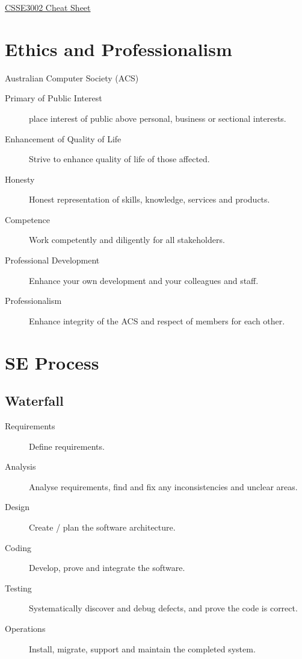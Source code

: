\documentclass[landscape]{cheat}
\begin{document}
\footnotesize
\begin{multicols}{3}

\begin{center}
\Large{\underline{CSSE3002 Cheat Sheet}} \\
\end{center}

\section{Ethics and Professionalism}
Australian Computer Society (ACS)
\begin{description}
\item[Primary of Public Interest] place interest of public above personal, business or sectional interests.
\item[Enhancement of Quality of Life] Strive to enhance quality of life of those affected.
\item[Honesty] Honest representation of skills, knowledge, services and products.
\item[Competence] Work competently and diligently for all stakeholders.
\item[Professional Development] Enhance your own development and your colleagues and staff.
\item[Professionalism] Enhance integrity of the ACS and respect of members for each other.
\end{description}

\section{SE Process}
\subsection{Waterfall}
\begin{description}
    \item[Requirements] Define requirements.
    \item[Analysis] Analyse requirements, find and fix any inconsistencies and unclear areas.
    \item[Design] Create / plan the software architecture.
    \item[Coding] Develop, prove and integrate the software.
    \item[Testing] Systematically discover and debug defects, and prove the code is correct.
    \item[Operations] Install, migrate, support and maintain the completed system.
\end{description}


\end{multicols}
\end{document}
